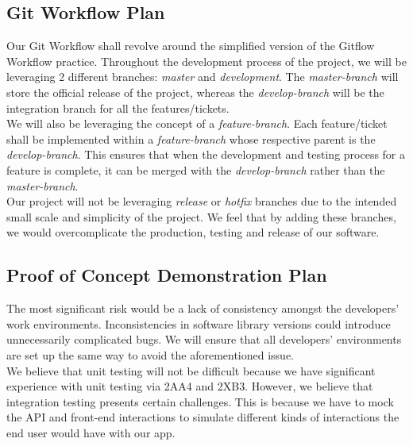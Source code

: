 \documentclass[11pt, oneside]{article}   	%
\begin{document}
\newpage
\subsection*{Git Workflow Plan}

Our Git Workflow shall revolve around the simplified version of the Gitflow Workflow practice. Throughout the development process of the project, we will be leveraging 2 different branches: {\it master} and {\it development}. The {\it master-branch} will store the official release of the project, whereas the {\it develop-branch} will be the integration branch for all the features/tickets.\\

We will also be leveraging the concept of a {\it feature-branch}. Each feature/ticket shall be implemented within a {\it feature-branch} whose respective parent is the {\it develop-branch}. This ensures that when the development and testing process for a feature is complete, it can be merged with the {\it develop-branch} rather than the {\it master-branch}.\\ 

Our project will not be leveraging {\it release} or {\it hotfix} branches due to the intended small scale and simplicity of the project. We feel that by adding these branches, we would overcomplicate the production, testing and release of our software.\\

\newpage
\subsection*{Proof of Concept Demonstration Plan}  

The most significant risk would be a lack of consistency amongst the developers' work environments. Inconsistencies in software library versions could introduce unnecessarily complicated bugs. We will ensure that all developers’ environments are set up the same way to avoid the aforementioned issue.\\

We believe that unit testing will not be difficult because we have significant experience with unit testing via 2AA4 and 2XB3. However, we believe that integration testing presents certain challenges. This is because we have to mock the API and front-end interactions to simulate different kinds of interactions the end user would have with our app.\\
\end{document}
